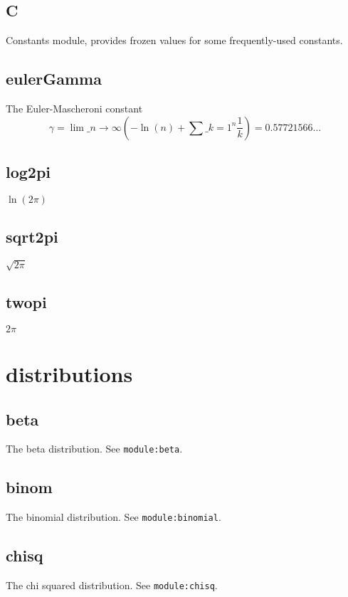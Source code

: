 \documentclass{article}
\begin{document}
    \subsection*{C}
    Constants module, provides frozen values for some frequently-used constants.


    \subsection*{eulerGamma}
    The Euler-Mascheroni constant
\[\gamma = \lim \_ {n \to \infty} \left(-\ln(n) + \sum \_ {k=1}^n \frac{1}{k}\right) = 0.57721566 \ldots\]


    \subsection*{log2pi}
    $\ln(2\pi)$


    \subsection*{sqrt2pi}
    $\sqrt{2\pi}$


    \subsection*{twopi}
    $2\pi$


  \section{distributions}
    \subsection*{beta}
    The beta distribution. See \texttt{module:beta}.


    \subsection*{binom}
    The binomial distribution. See \texttt{module:binomial}.


    \subsection*{chisq}
    The chi squared distribution. See \texttt{module:chisq}.
\end{document}
